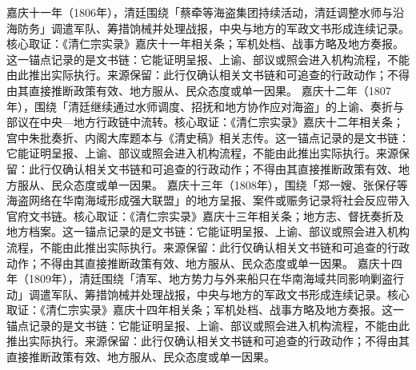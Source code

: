 嘉庆十一年（1806年），清廷围绕「蔡牵等海盗集团持续活动，清廷调整水师与沿海防务」调遣军队、筹措饷械并处理战报，中央与地方的军政文书形成连续记录。核心取证：《清仁宗实录》嘉庆十一年相关条；军机处档、战事方略及地方奏报。这一锚点记录的是文书链：它能证明呈报、上谕、部议或照会进入机构流程，不能由此推出实际执行。来源保留：此行仅确认相关文书链和可追查的行政动作；不得由其直接推断政策有效、地方服从、民众态度或单一因果。
嘉庆十二年（1807年），围绕「清廷继续通过水师调度、招抚和地方协作应对海盗」的上谕、奏折与部议在中央—地方行政链中流转。核心取证：《清仁宗实录》嘉庆十二年相关条；宫中朱批奏折、内阁大库题本与《清史稿》相关志传。这一锚点记录的是文书链：它能证明呈报、上谕、部议或照会进入机构流程，不能由此推出实际执行。来源保留：此行仅确认相关文书链和可追查的行政动作；不得由其直接推断政策有效、地方服从、民众态度或单一因果。
嘉庆十三年（1808年），围绕「郑一嫂、张保仔等海盗网络在华南海域形成强大联盟」的地方呈报、案件或赈务记录将社会反应带入官府文书链。核心取证：《清仁宗实录》嘉庆十三年相关条；地方志、督抚奏折及地方档案。这一锚点记录的是文书链：它能证明呈报、上谕、部议或照会进入机构流程，不能由此推出实际执行。来源保留：此行仅确认相关文书链和可追查的行政动作；不得由其直接推断政策有效、地方服从、民众态度或单一因果。
嘉庆十四年（1809年），清廷围绕「清军、地方势力与外来船只在华南海域共同影响剿盗行动」调遣军队、筹措饷械并处理战报，中央与地方的军政文书形成连续记录。核心取证：《清仁宗实录》嘉庆十四年相关条；军机处档、战事方略及地方奏报。这一锚点记录的是文书链：它能证明呈报、上谕、部议或照会进入机构流程，不能由此推出实际执行。来源保留：此行仅确认相关文书链和可追查的行政动作；不得由其直接推断政策有效、地方服从、民众态度或单一因果。
